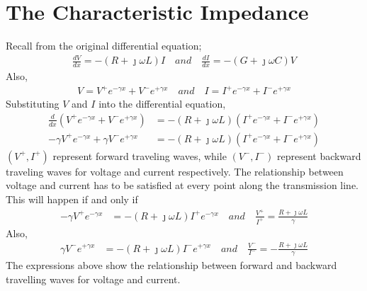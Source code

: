 \section{The Characteristic Impedance}
Recall from the original differential equation;
\begin{align*}
\frac{dV}{dx} = -(R+\jmath\omega L)I \quad and\quad \frac{dI}{dx} = -(G+\jmath\omega C)V
\end{align*}
Also, 
\begin{align*}
V = V^+e^{-\gamma x}+V^-e^{+\gamma x}\quad and \quad I = I^+e^{-\gamma x}+I^-e^{+\gamma x}
\end{align*}
Substituting $V$ and $I$ into the differential equation,
\begin{align*}
\frac{d}{dx}(V^+e^{-\gamma x}+V^-e^{+\gamma x}) &= -(R+\jmath\omega L)(I^+e^{-\gamma x}+I^-e^{+\gamma x})\\
-\gamma V^+e^{-\gamma x}+\gamma V^-e^{+\gamma x} &= -(R+\jmath\omega L)(I^+e^{-\gamma x}+I^-e^{+\gamma x})
\end{align*}
 $(V^+,I^+)$ represent forward traveling waves, while $(V^-,I^-)$ represent backward traveling waves for voltage and current respectively. The relationship between voltage and current has to be satisfied at every point along the transmission line. This will happen if and only if
\begin{align*}
-\gamma V^+e^{-\gamma x} &= -(R+\jmath\omega L)I^+e^{-\gamma x}\quad and\quad \frac{V^+}{I^+} = \frac{R+\jmath\omega L}{\gamma}
\end{align*}
Also, 
\begin{align*}
\gamma V^-e^{+\gamma x} &= -(R+\jmath\omega L)I^-e^{+\gamma x}\quad and\quad \frac{V^-}{I^-} = -\frac{R+\jmath\omega L}{\gamma}
\end{align*}
The expressions above show the relationship between forward and backward travelling waves for voltage and current.

